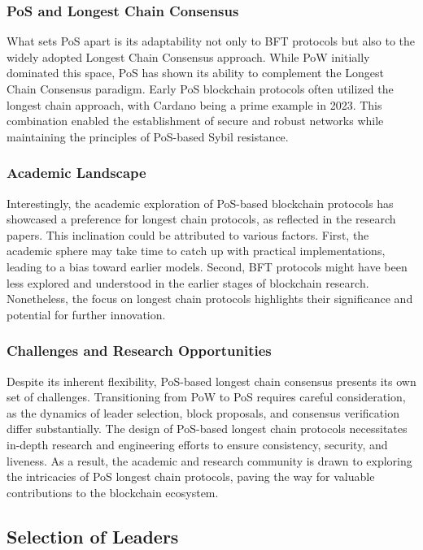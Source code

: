 \subsubsection{PoS and Longest Chain Consensus}
What sets PoS apart is its adaptability not only to BFT protocols but also to the widely adopted Longest Chain Consensus approach. While PoW initially dominated this space, PoS has shown its ability to complement the Longest Chain Consensus paradigm. Early PoS blockchain protocols often utilized the longest chain approach, with Cardano being a prime example in 2023. This combination enabled the establishment of secure and robust networks while maintaining the principles of PoS-based Sybil resistance.

\subsubsection{Academic Landscape}
Interestingly, the academic exploration of PoS-based blockchain protocols has showcased a preference for longest chain protocols, as reflected in the research papers. This inclination could be attributed to various factors. First, the academic sphere may take time to catch up with practical implementations, leading to a bias toward earlier models. Second, BFT protocols might have been less explored and understood in the earlier stages of blockchain research. Nonetheless, the focus on longest chain protocols highlights their significance and potential for further innovation.

\subsubsection{Challenges and Research Opportunities}
Despite its inherent flexibility, PoS-based longest chain consensus presents its own set of challenges. Transitioning from PoW to PoS requires careful consideration, as the dynamics of leader selection, block proposals, and consensus verification differ substantially. The design of PoS-based longest chain protocols necessitates in-depth research and engineering efforts to ensure consistency, security, and liveness. As a result, the academic and research community is drawn to exploring the intricacies of PoS longest chain protocols, paving the way for valuable contributions to the blockchain ecosystem.
\subsection{Selection of Leaders}

